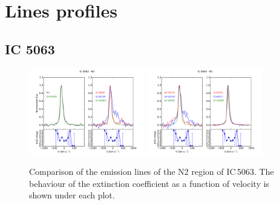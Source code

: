 \documentclass[../main.tex]{subfiles}
\begin{document}
\chapter{Lines profiles}
\label{cap:appendix1}

\section{IC 5063}

\begin{figure}
\centering
\includegraphics[width=0.45\textwidth]{images/paper1/IC5063_n2_l1.pdf} \quad
\includegraphics[width=0.45\textwidth]{images/paper1/IC5063_n2_l2.pdf}\\
\caption[]{Comparison of the emission lines of the N2 region of IC\,5063. The behaviour of the extinction coefficient as a function of velocity is shown under each plot.}
\label{fig:n2l1_I}
\end{figure}
\end{document}
